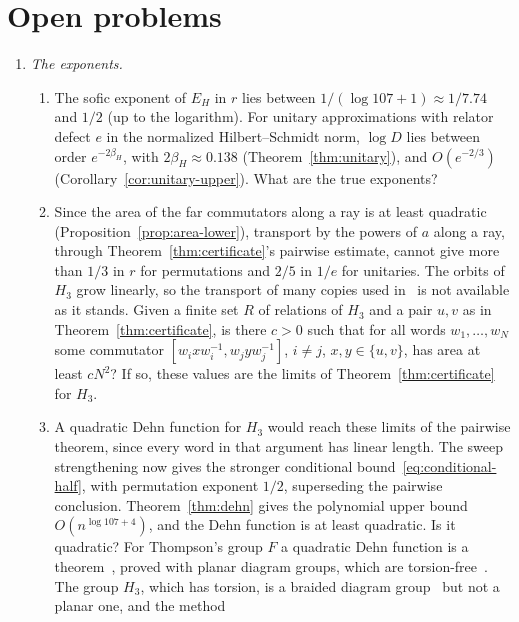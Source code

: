 \documentclass[11pt,a4paper]{article}
\theoremstyle{plain}
\theoremstyle{definition}
\theoremstyle{remark}
\begin{document}
\section{Open problems}\label{sec:open}

\begin{enumerate}[label=(\arabic*)]
\item \emph{The exponents.}
\begin{enumerate}[label=(\alph*),itemsep=1pt]
\item The sofic exponent of $E_H$ in $r$ lies between $1/(\log107+1)\approx1/7.74$ and $1/2$ (up to the logarithm). For unitary
approximations with relator defect $e$ in the normalized Hilbert--Schmidt norm, $\log D$ lies between order $e^{-2\beta_H}$, with
$2\beta_H\approx0.138$ (Theorem~\ref{thm:unitary}), and $O(e^{-2/3})$ (Corollary~\ref{cor:unitary-upper}). What are the true exponents?
\item Since the area of the far commutators along a ray is at least quadratic (Proposition~\ref{prop:area-lower}), transport by the powers of
$a$ along a ray, through Theorem~\ref{thm:certificate}'s pairwise estimate, cannot give more than $1/3$ in $r$ for permutations and $2/5$ in $1/e$ for unitaries. The orbits of $H_3$ grow linearly, so
the transport of many copies used in~\cite{DouglasMghirbiC} is not available as it stands. Given a finite set $R$ of relations of $H_3$ and a
pair $u,v$ as in Theorem~\ref{thm:certificate}, is there $c>0$ such that for all words $w_1,\dots,w_N$ some commutator
$[w_ixw_i^{-1},w_jyw_j^{-1}]$, $i\ne j$, $x,y\in\{u,v\}$, has area at least $cN^2$? If so, these values are the limits of
Theorem~\ref{thm:certificate} for $H_3$.
\item A quadratic Dehn function for $H_3$ would reach these limits of the pairwise theorem, since every word in that argument has linear length.
The sweep strengthening now gives the stronger conditional bound~\eqref{eq:conditional-half}, with permutation exponent $1/2$,
superseding the pairwise conclusion. Theorem~\ref{thm:dehn}
gives the polynomial upper bound $O(n^{\log107+4})$, and the Dehn function is at least quadratic. Is it quadratic? For Thompson's group $F$ a
quadratic Dehn function is a theorem~\cite{Guba2006}, proved with planar diagram groups, which are torsion-free~\cite{GubaSapir1997}.
The group $H_3$, which has torsion, is a braided diagram group~\cite[Example~4.3]{FarleyHughes2017} but not a planar one, and the method

\end{enumerate}
\end{enumerate}
\end{document}
